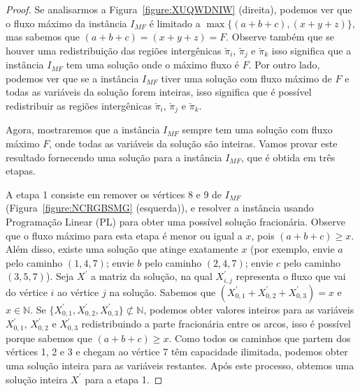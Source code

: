 \begin{proof}


Se analisarmos a Figura~\ref{figure:XUQWDNIW} (direita), podemos ver que o fluxo máximo da instância $I_{MF}$ é limitado a $\max\{(a+b+c),(x+ y+z)\}$, mas sabemos que $(a+b+c) = (x+y+z) = F$. Observe também que se houver uma redistribuição das regiões intergênicas $\breve\pi_i$, $\breve\pi_j$ e $\breve\pi_k$ isso significa que a instância $I_{MF}$ tem uma solução onde o máximo fluxo é $F$. Por outro lado, podemos ver que se a instância $I_{MF}$ tiver uma solução com fluxo máximo de $F$ e todas as variáveis da solução forem inteiras, isso significa que é possível redistribuir as regiões intergênicas $\breve \pi_i$, $\breve\pi_j$ e $\breve\pi_k$.

Agora, mostraremos que a instância $I_{MF}$ sempre tem uma solução com fluxo máximo $F$, onde todas as variáveis da solução são inteiras. Vamos provar este resultado fornecendo uma solução para a instância $I_{MF}$, que é obtida em três etapas.

A etapa 1 consiste em remover os vértices 8 e 9 de $I_{MF}$ (Figura~\ref{figure:NCRGBSMG} (esquerda)), e resolver a instância usando Programação Linear (PL) para obter uma possível solução fracionária. Observe que o fluxo máximo para esta etapa é menor ou igual a $x$, pois $(a+b+c) \ge x$. Além disso, existe uma solução que atinge exatamente $x$ (por exemplo, envie $a$ pelo caminho $(1,4,7)$; envie $b$ pelo caminho $(2,4,7)$; envie $c$ pelo caminho $(3,5,7)$). Seja $X^{\prime}$ a matriz da solução, na qual $X^{\prime}_{i,j}$ representa o fluxo que vai do vértice $i$ ao vértice $j$ na solução. Sabemos que $(X^{\prime}_{0,1}+X^{\prime}_{0,2}+X^{\prime}_{0,3}) = x$ e $x \in \mathbb{N}$. Se $\{X^{\prime}_{0,1},X^{\prime}_{0,2},X^{\prime}_{0,3}\} \not\subset \mathbb {N}$, podemos obter valores inteiros para as variáveis $X^{\prime}_{0,1}$, $X^{\prime}_{0,2}$ e $X^{\prime }_{0,3}$ redistribuindo a parte fracionária entre os arcos, isso é possível porque sabemos que $(a+b+c) \ge x$. Como todos os caminhos que partem dos vértices 1, 2 e 3 e chegam ao vértice 7 têm capacidade ilimitada, podemos obter uma solução inteira para as variáveis restantes. Após este processo, obtemos uma solução inteira $X^{\prime}$ para a etapa 1.


\end{proof}
